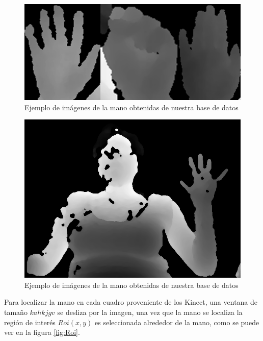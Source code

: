 \begin{figure}[!h]
\begin{center}
\includegraphics[scale=.5]{./Figures/TrainingImages.png}
\end{center}
\caption{Ejemplo de imágenes de la mano obtenidas de nuestra base de datos}
\label{fig:ImagenesPoses}
\end{figure}  

\begin{figure}[!h]
\begin{center}
\includegraphics[scale=.5]{./Figures/166_W13.png}
\end{center}
\caption{Ejemplo de imágenes de la mano obtenidas de nuestra base de datos}
\label{fig:ImagenFondo}
\end{figure}  

Para localizar la mano en cada cuadro proveniente de los Kinect, una ventana de tamaño $kahkjgv$ se desliza por la imagen, una vez que la mano se localiza la región de interés $Roi(x,y)$ es seleccionada alrededor de la mano, como se puede ver en la figura \ref{fig:Roi}.

